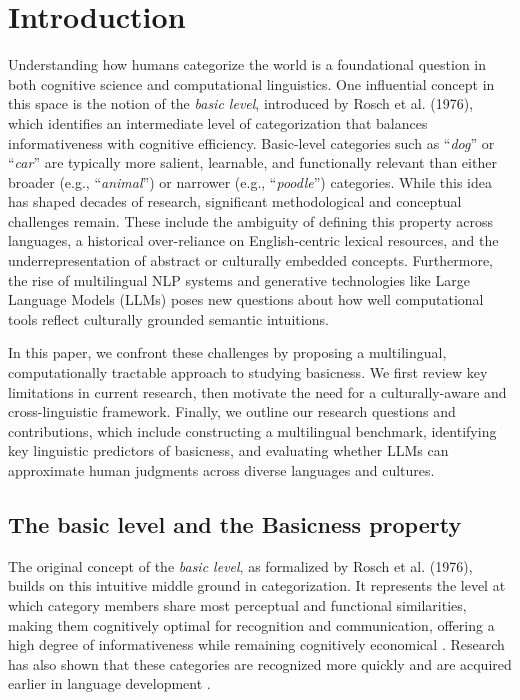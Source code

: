 \documentclass[preprint,12pt,authoryear]{elsarticle}
\begin{document}
\section{Introduction}
\label{introduction}

Understanding how humans categorize the world is a foundational question in both cognitive science and computational linguistics. One influential concept in this space is the notion of the \textit{basic level}, introduced by Rosch et al. (1976), which identifies an intermediate level of categorization that balances informativeness with cognitive efficiency. Basic-level categories such as ``\textit{dog}'' or ``\textit{car}'' are typically more salient, learnable, and functionally relevant than either broader (e.g., ``\textit{animal}'') or narrower (e.g., ``\textit{poodle}'') categories. While this idea has shaped decades of research, significant methodological and conceptual challenges remain. These include the ambiguity of defining this property across languages, a historical over-reliance on English-centric lexical resources, and the underrepresentation of abstract or culturally embedded concepts. Furthermore, the rise of multilingual NLP systems and generative technologies like Large Language Models (LLMs) poses new questions about how well computational tools reflect culturally grounded semantic intuitions. 

In this paper, we confront these challenges by proposing a multilingual, computationally tractable approach to studying basicness. We first review key limitations in current research, then motivate the need for a culturally-aware and cross-linguistic framework. Finally, we outline our research questions and contributions, which include constructing a multilingual benchmark, identifying key linguistic predictors of basicness, and evaluating whether LLMs can approximate human judgments across diverse languages and cultures.

\subsection{The basic level and the Basicness property}
The original concept of the \textit{basic level}, as formalized by Rosch et al. (1976), builds on this intuitive middle ground in categorization. It represents the level at which category members share most perceptual and functional similarities, making them cognitively optimal for recognition and communication, offering a high degree of informativeness while remaining cognitively economical \cite{tversky_objects_1984, archambault_natural_2000, hollink_predicting_2020, hajibayova_basic-level_2013}.  
Research has also shown that these categories are recognized more quickly and are acquired earlier in language development \cite{murphy_explaining_2016, rogers_object_2007}. 
\end{document}
